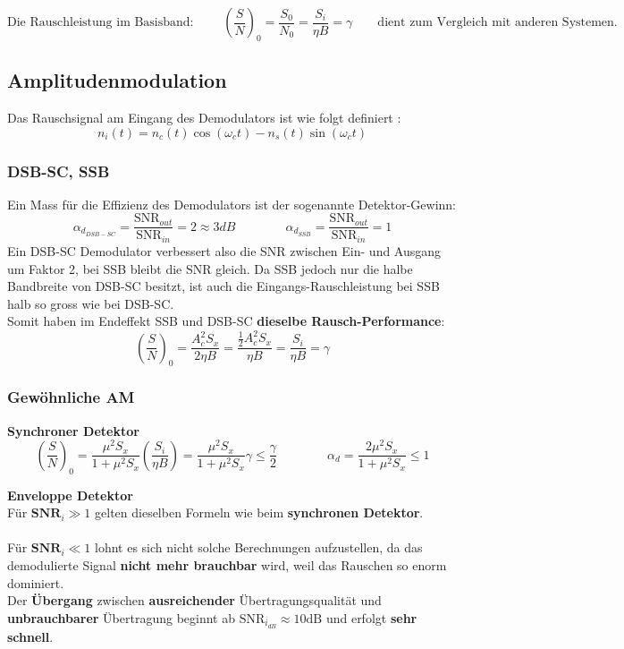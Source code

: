 $$ \text{Die Rauschleistung im Basisband: } \qquad \boxed{\left(\dfrac{S}{N}\right)_0 =
\dfrac{S_0}{N_0} = \dfrac{S_i}{\eta B} = \gamma} \qquad \text{dient zum Vergleich mit anderen
Systemen.}$$

\subsection{Amplitudenmodulation }
\begin{figure}[!ht]
\begin{center}
	
\end{center}
\end{figure}
Das Rauschsignal am Eingang des Demodulators ist wie folgt definiert
:  
$$n_i(t) = n_c(t) \cos(\omega_c t) - n_s(t) \sin(\omega_c t) $$


\subsubsection{DSB-SC, SSB }
Ein Mass für die Effizienz des Demodulators ist der sogenannte Detektor-Gewinn: \\
$$ \alpha_{d_{DSB-SC}} = \dfrac{\text{SNR}_{out}}{\text{SNR}_{in}} = 2 \approx 3 dB
\qquad \qquad
 \alpha_{d_{SSB}} = \dfrac{\text{SNR}_{out}}{\text{SNR}_{in}} = 1
$$
Ein DSB-SC Demodulator verbessert also die SNR zwischen Ein- und Ausgang um Faktor 2, bei SSB
bleibt die SNR gleich. Da SSB jedoch nur die halbe Bandbreite von DSB-SC besitzt, ist auch die
Eingangs-Rauschleistung bei SSB halb so gross wie bei DSB-SC. \\
Somit haben im Endeffekt SSB und DSB-SC \textbf{dieselbe Rausch-Performance}: 
	$$ \left(\dfrac{S}{N}\right)_0 =
	\dfrac{A_c^2 S_x}{2 \eta B} = \dfrac{\frac12 A_c^2 S_x}{\eta B} = \dfrac{S_i}{\eta B} = \gamma $$

\subsubsection{Gewöhnliche AM }

\textbf{Synchroner Detektor}
$$ \left(\dfrac{S}{N}\right)_0 =
\dfrac{\mu^2 S_x}{1 + \mu^2 S_x} \left(\dfrac{S_i}{\eta B}\right) = \dfrac{\mu^2 S_x}{1 + \mu^2
S_x} \gamma \leq \dfrac{\gamma}{2} \qquad \qquad
\alpha_d = \dfrac{2 \mu^2 S_x}{1 + \mu^2 S_x} \leq 1$$


\textbf{Enveloppe Detektor} \\
Für \boldmath$ \textbf{SNR}_i \gg 1 $ gelten dieselben Formeln wie beim \textbf{synchronen
Detektor}. \\ \\ Für \boldmath$ \textbf{SNR}_i \ll 1 $ lohnt es sich nicht solche
Berechnungen aufzustellen, da das demodulierte Signal \textbf{nicht mehr brauchbar} wird, weil das Rauschen so enorm dominiert. \\
Der \textbf{Übergang} zwischen \textbf{ausreichender} Übertragungsqualität und \textbf{unbrauchbarer}  
Übertragung beginnt ab \unboldmath$ \text{SNR}_{i_{dB}} \approx 10 \text{dB} $ und erfolgt
\textbf{sehr schnell}.

